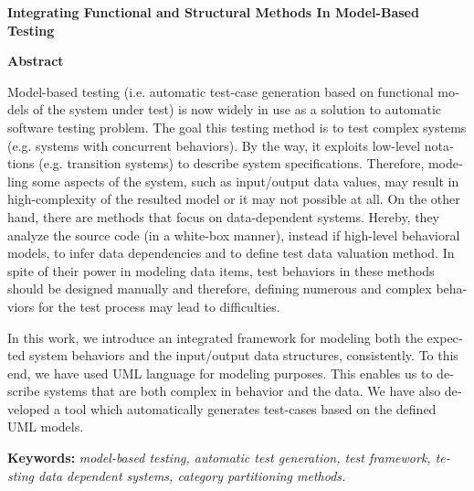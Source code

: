 \documentclass[twoside, a4paper,11pt]{book}
\numberwithin{equation}{chapter}
\numberwithin{table}{chapter}
\numberwithin{figure}{chapter}
\numberwithin{equation}{chapter}
\begin{document}
\linespread{1.2}

\small{

\clearpage
{}
{}

}

\newpage
\begin{multicols}{2}
\def\glossaryname{واژه‌نامه‌ی فارسی به انگلیسی}
\printglossary
{}
\end{multicols}


\begin{latin}
\pagestyle{empty}


\newpage
{\centering\Large{\bf{Integrating Functional and Structural Methods In Model-Based Testing}} \par}
{\centering\small{\bf{Abstract}} \par \vskip 1cm}
\noindent Model-based testing (i.e. automatic test-case generation based on functional models of the system under test) is now widely in use as a solution to automatic software testing problem. The goal this testing method is to test complex systems (e.g. systems with concurrent behaviors). By the way, it exploits low-level notations (e.g. transition systems) to describe system specifications. Therefore, modeling some aspects of the system, such as input/output data values, may result in high-complexity of the resulted model or it may not possible at all.
On the other hand, there are methods that focus on data-dependent systems. Hereby, they analyze the source code (in a white-box manner), instead if high-level behavioral models,  to infer data dependencies and to define test data valuation method. In spite of their power in modeling data items, test behaviors in these methods should be designed manually and therefore, defining numerous and complex behaviors for the test process may lead to difficulties.

In this work, we introduce an integrated framework for modeling both the expected system behaviors and the input/output data structures, consistently. To this end, we have used UML language for modeling purposes. This enables us to describe systems that are both complex in behavior and the data. We have also developed a tool which automatically generates test-cases based on the defined UML models. 

{\par\vspace{5mm}}
\noindent\textbf{Keywords: }\textit{model-based testing, automatic test generation, test framework, testing data dependent systems, category partitioning methods.}


\end{latin}
\end{document}
